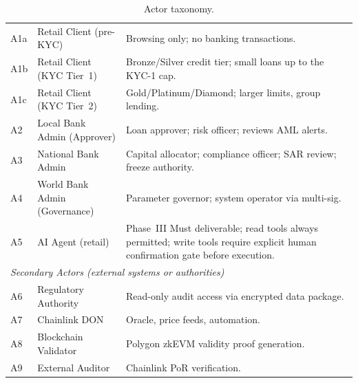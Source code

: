 \begin{table}[H]
\centering
\caption[Actor taxonomy]{Actor taxonomy.}
\label{tab:actor-taxonomy}
\begin{tabular}{p{1.2cm}p{4.2cm}p{7.9cm}}
A1a & Retail Client (pre-KYC) & Browsing only; no banking transactions. \\
A1b & Retail Client (KYC Tier~1) & Bronze/Silver credit tier; small loans up to the KYC-1 cap. \\
A1c & Retail Client (KYC Tier~2) & Gold/Platinum/Diamond; larger limits, group lending. \\
A2 & Local Bank Admin (Approver) & Loan approver; risk officer; reviews AML alerts. \\
A3 & National Bank Admin & Capital allocator; compliance officer; SAR review; freeze authority. \\
A4 & World Bank Admin (Governance) & Parameter governor; system operator via multi-sig. \\
A5 & AI Agent (retail) & Phase~III Must deliverable; read tools always permitted; write tools require explicit human confirmation gate before execution. \\
\multicolumn{3}{l}{\textit{Secondary Actors (external systems or authorities)}} \\
A6 & Regulatory Authority & Read-only audit access via encrypted data package. \\
A7 & Chainlink DON & Oracle, price feeds, automation. \\
A8 & Blockchain Validator & Polygon zkEVM validity proof generation. \\
A9 & External Auditor & Chainlink PoR verification. \\
\bottomrule
\end{tabular}
\end{table}

